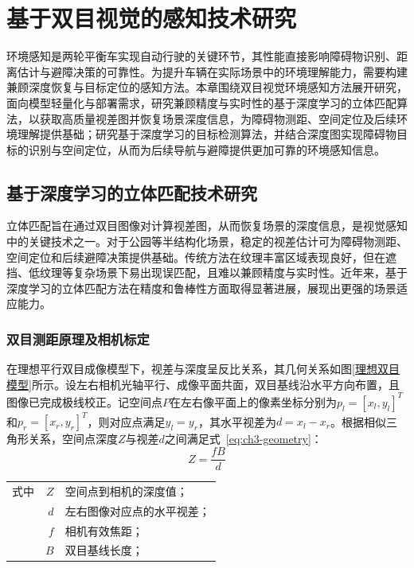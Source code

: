 ﻿%

\chapter{基于双目视觉的感知技术研究}
环境感知是两轮平衡车实现自动行驶的关键环节，其性能直接影响障碍物识别、距离估计与避障决策的可靠性。为提升车辆在实际场景中的环境理解能力，需要构建兼顾深度恢复与目标定位的感知方法。本章围绕双目视觉环境感知方法展开研究，面向模型轻量化与部署需求，研究兼顾精度与实时性的基于深度学习的立体匹配算法，以获取高质量视差图并恢复场景深度信息，为障碍物测距、空间定位及后续环境理解提供基础；研究基于深度学习的目标检测算法，并结合深度图实现障碍物目标的识别与空间定位，从而为后续导航与避障提供更加可靠的环境感知信息。

\section{基于深度学习的立体匹配技术研究}

立体匹配旨在通过双目图像对计算视差图，从而恢复场景的深度信息，是视觉感知中的关键技术之一。对于公园等半结构化场景，稳定的视差估计可为障碍物测距、空间定位和后续避障决策提供基础。传统方法在纹理丰富区域表现良好，但在遮挡、低纹理等复杂场景下易出现误匹配，且难以兼顾精度与实时性。近年来，基于深度学习的立体匹配方法在精度和鲁棒性方面取得显著进展，展现出更强的场景适应能力\cite{tosiSurveyDeepStereo2025,zhangReviewStereoMatching2024}。

\subsection{双目测距原理及相机标定}

在理想平行双目成像模型下，视差与深度呈反比关系，其几何关系如图\ref{理想双目模型}所示。设左右相机光轴平行、成像平面共面，双目基线沿水平方向布置，且图像已完成极线校正。记空间点$P$在左右像平面上的像素坐标分别为$p_l=[x_l,y_l]^T$和$p_r=[x_r,y_r]^T$，则对应点满足$y_l=y_r$，其水平视差为$d=x_l-x_r$。根据相似三角形关系，空间点深度$Z$与视差$d$之间满足式~\eqref{eq:ch3-geometry}：
\begin{equation}\label{eq:ch3-geometry}
Z=\frac{fB}{d}
\end{equation}
\begin{tabularx}{\textwidth}{@{}l@{\quad}r@{———}X@{}}
式中& $Z$ & 空间点到相机的深度值；\\
& $d$ & 左右图像对应点的水平视差；\\
& $f$ & 相机有效焦距；\\
& $B$ & 双目基线长度；\\
\end{tabularx}\vspace{3.15bp}

